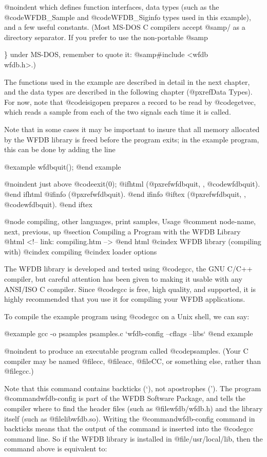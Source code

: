 @noindent
which defines function interfaces, data types (such as the
@code{WFDB_Sample} and @code{WFDB_Siginfo} types used in this example), and
a few useful constants.  (Most MS-DOS C compilers accept @samp{/} as a
directory separator.  If you prefer to use the non-portable @samp{\}
under MS-DOS, remember to quote it: @samp{#include <wfdb\\wfdb.h>}.)

The functions used in the example are described in detail in the next
chapter, and the data types are described in the following chapter
(@pxref{Data Types}).  For now, note that @code{isigopen} prepares a
record to be read by @code{getvec}, which reads a sample from each of
the two signals each time it is called.  

Note that in some cases it may be important to insure that all memory
allocated by the WFDB library is freed before the program exits;  in
the example program, this can be done by adding the line

@example
wfdbquit();
@end example

@noindent
just above @code{exit(0);}
@ifhtml
(@pxref{wfdbquit, , @code{wfdbquit}}).
@end ifhtml
@ifinfo
(@pxref{wfdbquit}).
@end ifinfo
@iftex
(@pxref{wfdbquit, , @code{wfdbquit}}).
@end iftex

@node     compiling, other languages, print samples, Usage
@comment  node-name,  next,  previous,  up
@section Compiling a Program with the WFDB Library
@html
<!-- link: compiling.htm -->
@end html
@cindex WFDB library (compiling with)
@cindex compiling
@cindex loader options

The WFDB library is developed and tested using @code{gcc}, the GNU C/C++
compiler, but careful attention has been given to making it usable with any
ANSI/ISO C compiler.  Since @code{gcc} is free, high quality, and supported, it
is highly recommended that you use it for compiling your WFDB applications.

To compile the example program using @code{gcc} on a Unix shell, we can say:

@example
gcc -o psamples psamples.c `wfdb-config --cflags --libs`
@end example

@noindent
to produce an executable program called @code{psamples}.  (Your C
compiler may be named @file{cc}, @file{acc}, @file{CC}, or something
else, rather than @file{gcc}.)

Note that this command contains backticks (`), not apostrophes (').  The
program @command{wfdb-config} is part of the WFDB Software Package, and tells
the compiler where to find the header files (such as @file{wfdb/wfdb.h}) and
the library itself (such as @file{libwfdb.so}).  Writing the
@command{wfdb-config} command in backticks means that the output of the command
is inserted into the @code{gcc} command line.  So if the WFDB library is
installed in @file{/usr/local/lib}, then the command above is equivalent to:

}
